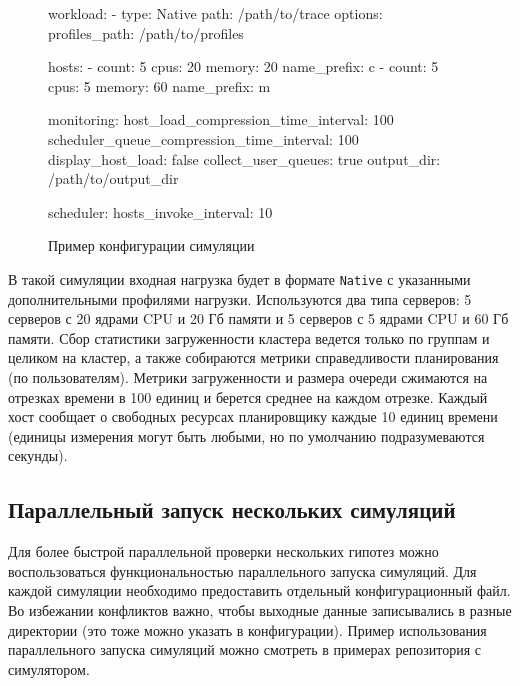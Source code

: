 \begin{figure}[h!]
    \footnotesize
    \begin{yamlcode}
                    workload:
                      - type: Native
                        path: /path/to/trace
                        options: 
                          profiles_path: /path/to/profiles
                    
                    hosts: 
                      - count: 5
                        cpus: 20
                        memory: 20
                        name_prefix: c
                      - count: 5
                        cpus: 5
                        memory: 60
                        name_prefix: m
                    
                    monitoring:
                      host_load_compression_time_interval: 100
                      scheduler_queue_compression_time_interval: 100
                      display_host_load: false 
                      collect_user_queues: true
                      output_dir: /path/to/output_dir
                    
                    scheduler:
                      hosts_invoke_interval: 10
\end{yamlcode}
\caption{Пример конфигурации симуляции}
\label{fig:example-sim-config}
\end{figure}

В такой симуляции входная нагрузка будет в формате \texttt{Native} с указанными дополнительными профилями нагрузки. Используются два типа серверов: 5 серверов с 20 ядрами CPU и 20 Гб памяти и 5 серверов с 5 ядрами CPU и 60 Гб памяти. Сбор статистики загруженности кластера ведется только по группам и целиком на кластер, а также собираются метрики справедливости планирования (по пользователям). Метрики загруженности и размера очереди сжимаются на отрезках времени в 100 единиц и берется среднее на каждом отрезке. Каждый хост сообщает о свободных ресурсах планировщику каждые 10 единиц времени (единицы измерения могут быть любыми, но по умолчанию подразумеваются секунды). 

\subsection{Параллельный запуск нескольких симуляций}

Для более быстрой параллельной проверки нескольких гипотез можно воспользоваться функциональностью параллельного запуска симуляций. Для каждой симуляции необходимо предоставить отдельный конфигурационный файл. Во избежании конфликтов важно, чтобы выходные данные записывались в разные директории (это тоже можно указать в конфигурации). Пример использования параллельного запуска симуляций можно смотреть в примерах репозитория с симулятором\cite{dslab-cluster-scheduling-parallel-launching}.


